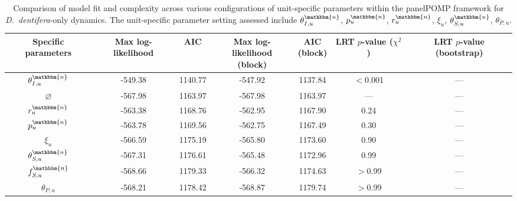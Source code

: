\documentclass[aoas,preprint]{imsart}\usepackage[]{graphicx}\usepackage[]{xcolor}
\newcommand\unit{u}
\newcommand\native{\mathbbm{n}}
\begin{document}
\begin{table}[h!]
\centering
\begin{center}
\begin{tabular}{||c |c |c |c|c|c|c||}
 \hline
Specific parameters  & Max log-likelihood & AIC & \makecell[c]{Max log-likelihood\\(block)} & \makecell[c]{AIC\\(block)} & \makecell[c]{LRT\\$p$-value\\($\chi^2$)} & \makecell[c]{LRT\\$p$-value\\(bootstrap)}\\ [0.5ex]
 \hline\hline
$\theta^{\native}_{I,\unit}$ & -549.38& 1140.77& -547.92& 1137.84 & $<$0.001 & --- \\
$\varnothing$  & -567.98& 1163.97& -567.98& 1163.97 & --- & --- \\
 $r^{\native}_{\unit}$ & -563.38& 1168.76& -562.95& 1167.90 & 0.24 & --- \\
$p^{\native}_{\unit}$ & -563.78& 1169.56& -562.75& 1167.49 & 0.30 & --- \\
$\xi_{\unit}$ & -566.59& 1175.19& -565.80& 1173.60 & 0.90 & --- \\
$\theta^{\native}_{S,\unit}$ & -567.31& 1176.61& -565.48& 1172.96 & 0.99 & --- \\
$f^{\native}_{S,\unit}$ & -568.66& 1179.33& -566.32& 1174.63 & $>$0.99 & --- \\
$\theta_{P,\unit}$& -568.21& 1178.42& -568.87& 1179.74 & $>$0.99 & --- \\[1ex]
 \hline
\end{tabular}
\end{center}
\caption{Comparison of model fit and complexity across various configurations of unit-specific parameters within the panelPOMP framework for \textit{D.~dentifera}-only dynamics. The unit-specific parameter setting assessed include $\theta^{\native}_{I,\unit}$, $p^{\native}_{\unit}$, $r^{\native}_{\unit}$, $\xi_{\unit}$, $\theta^{\native}_{S,\unit}$, $\theta_{P,\unit}$.}
\label{Table:SIRJPF_dent_model_comparison}
\end{table}
\end{document}
